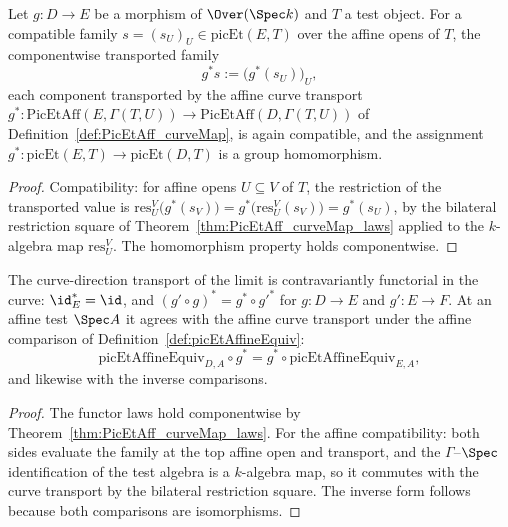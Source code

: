\begin{definition}
  \label{def:picEtPullback}
  \leanok
  Let \(g \colon D \to E\) be a morphism of \(\Over(\Spec k)\) and \(T\) a test object.
  For a compatible family \(s = (s_U)_U \in \mathrm{picEt}(E, T)\) over the affine opens
  of \(T\), the componentwise transported family
  \[
    g^{*} s := \bigl( g^{*}(s_U) \bigr)_{U},
  \]
  each component transported by the affine curve transport
  \(g^{*} \colon \mathrm{PicEtAff}(E, \Gamma(T, U)) \to
  \mathrm{PicEtAff}(D, \Gamma(T, U))\) of Definition~\ref{def:PicEtAff_curveMap}, is
  again compatible, and the assignment
  \(g^{*} \colon \mathrm{picEt}(E, T) \to \mathrm{picEt}(D, T)\) is a group
  homomorphism.
\end{definition}
\begin{proof}
  \leanok
  Compatibility: for affine opens \(U \subseteq V\) of \(T\), the restriction of the
  transported value is
  \(\mathrm{res}^V_U\bigl(g^{*}(s_V)\bigr) = g^{*}\bigl(\mathrm{res}^V_U(s_V)\bigr)
  = g^{*}(s_U)\), by the bilateral restriction square of
  Theorem~\ref{thm:PicEtAff_curveMap_laws} applied to the \(k\)-algebra map
  \(\mathrm{res}^V_U\). The homomorphism property holds componentwise.
\end{proof}

\begin{theorem}
  \label{thm:picEtPullback_laws}
  \leanok
  The curve-direction transport of the limit is contravariantly functorial in the curve:
  \(\id_E^{*} = \id\), and \((g' \circ g)^{*} = g^{*} \circ g'^{*}\) for
  \(g \colon D \to E\) and \(g' \colon E \to F\). At an affine test \(\Spec A\) it
  agrees with the affine curve transport under the affine comparison of
  Definition~\ref{def:picEtAffineEquiv}:
  \[
    \mathrm{picEtAffineEquiv}_{D,A} \circ g^{*}
      = g^{*} \circ \mathrm{picEtAffineEquiv}_{E,A},
  \]
  and likewise with the inverse comparisons.
\end{theorem}
\begin{proof}
  \leanok
  The functor laws hold componentwise by Theorem~\ref{thm:PicEtAff_curveMap_laws}. For
  the affine compatibility: both sides evaluate the family at the top affine open and
  transport, and the \(\Gamma\)--\(\Spec\) identification of the test algebra is a
  \(k\)-algebra map, so it commutes with the curve transport by the bilateral
  restriction square. The inverse form follows because both comparisons are
  isomorphisms.
\end{proof}

